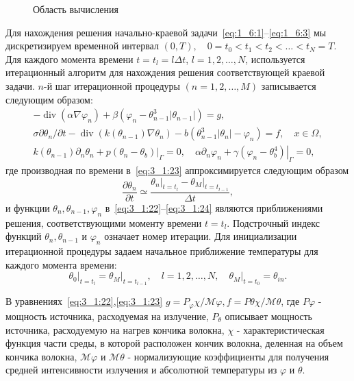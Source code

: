 \begin{figure}[h!t]
    \caption{Область вычисления}
    \label{fig:4_3:3}
\end{figure}
Для нахождения решения начально-краевой
задачи~\eqref{eq:1_6:1}--\eqref{eq:1_6:3}
мы дискретизируем временной интервал
$(0, T), \quad 0=t_{0}<t_{1}<t_{2}<\ldots<t_{N}=T$.
Для каждого момента времени $t=t_{l}=l \Delta t$, $l=1,2, \ldots, N$,
используется итерационный алгоритм для нахождения решения соответствующей
краевой задачи. $n$-й шаг итерационной процедуры $(n=1,2, \ldots, M)$
записывается следующим образом:
\begin{gather}
    -\operatorname{div}\left(\alpha \nabla \varphi_{n}\right)
    +\beta\left(\varphi_{n}-\theta_{n-1}^{3}
    \left|\theta_{n-1}\right|\right)=g, \label{eq:3_1:22}\\
    \sigma \partial \theta_{n} / \partial t
    -\operatorname{div}\left(k\left(\theta_{n-1}\right)
    \nabla \theta_{n}\right)
    -b\left(\theta_{n-1}^{3}\left|\theta_{n}\right|
    -\varphi_{n}\right)=f, \quad x \in \Omega, \label{eq:3_1:23}\\
    k\left(\theta_{n-1}\right) \partial_{n} \theta_{n}
    +\left.p\left(\theta_{n}-\theta_{b}\right)\right|_{\Gamma}=0,
    \quad \alpha \partial_{n} \varphi_{n}+\left.\gamma
    \left(\varphi_{n}-\theta_{b}^{4}\right)\right|_{\Gamma}=0,\label{eq:3_1:24}
\end{gather}
где производная по времени в~\eqref{eq:3_1:23}
аппроксимируется следующим образом
\[
    \frac{\partial \theta_{n}}{\partial t} \simeq
    \frac{
        \left.\theta_{n}\right|_{t=t_{l}}
        -\left.\theta_{M}\right|_{t=t_{l-1}}
    }{\Delta t},
\]
и функции $\theta_{n}, \theta_{n-1}, \varphi_{n}$
в~\eqref{eq:3_1:22}--\eqref{eq:3_1:24} являются приближениями решения,
соответствующими моменту времени $t=t_{l}$.
Подстрочный индекс функций
$\theta_{n}, \theta_{n-1}$ и $\varphi_{n}$ означает номер итерации.
Для инициализации итерационной процедуры задаем начальное приближение
температуры для каждого момента времени:
\begin{equation}
    \label{eq:3_1:25}
    \left.\theta_{0}\right|_{t=t_{l}}=
    \left.\theta_{M}\right|_{t=t_{l-1}},
    \quad l=1,2, \ldots, N, \left.\quad
    \theta_{M}\right|_{t=t_{0}}=\theta_{i n}.
\end{equation}

В уравнениях~\eqref{eq:3_1:22},\eqref{eq:3_1:23}
$g=P_{\varphi} \chi / \mathcal{M}{\varphi},
f=P{\theta} \chi / \mathcal{M}{\theta}$,
где $P{\varphi}$ - мощность источника, расходуемая на излучение,
$P_{\theta}$ описывает мощность источника, расходуемую на нагрев
кончика волокна, $\chi$ - характеристическая функция части среды,
в которой расположен кончик волокна, деленная на объем кончика волокна,
$\mathcal{M}{\varphi}$ и $\mathcal{M}{\theta}$ - нормализующие коэффициенты
для получения средней интенсивности излучения
и абсолютной температуры из $\varphi$ и $\theta$.

